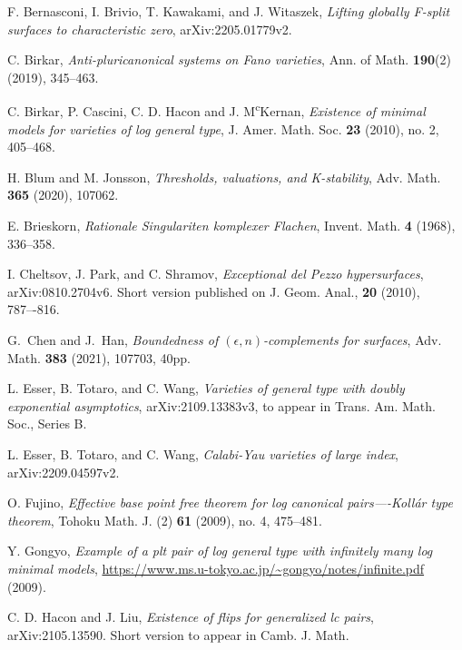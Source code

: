 \documentclass[11pt]{amsart}
\numberwithin{equation}{section}
\theoremstyle{definition}
\theoremstyle{definition}
\theoremstyle{definition}
\begin{document}
\begin{thebibliography}{ABCDE}
 F. Bernasconi, I. Brivio, T. Kawakami, and J. Witaszek, \textit{Lifting globally F-split surfaces to characteristic zero}, arXiv:2205.01779v2.

 C. Birkar, \textit{Anti-pluricanonical systems on Fano varieties}, Ann. of Math. \textbf{190}(2) (2019), 345--463.



	
C. Birkar, P. Cascini, C. D. Hacon and J. M\textsuperscript{c}Kernan, \textit{Existence of minimal models for varieties of log general type}, J. Amer. Math. Soc. \textbf{23} (2010), no. 2, 405--468.

 H. Blum and M. Jonsson, \textit{Thresholds, valuations, and K-stability}, Adv. Math. \textbf{365} (2020), 107062.

 E. Brieskorn, \textit{Rationale Singulariten komplexer Flachen}, Invent. Math. \textbf{4} (1968), 336--358.

 I. Cheltsov, J. Park, and C. Shramov, \textit{Exceptional del Pezzo hypersurfaces}, arXiv:0810.2704v6. Short version published on J. Geom. Anal., \textbf{20} (2010), 787–-816.

 G.~Chen and J.~Han, \textit{Boundedness of $(\epsilon, n)$-complements for surfaces}, Adv. Math. \textbf{383} (2021), 107703, 40pp.

 L. Esser, B. Totaro, and C. Wang, \textit{Varieties of general type with doubly exponential asymptotics}, arXiv:2109.13383v3, to appear in Trans. Am. Math. Soc., Series B.

 L. Esser, B. Totaro, and C. Wang, \textit{Calabi-Yau varieties of large index}, arXiv:2209.04597v2.

 O. Fujino, \textit{Effective base point free theorem for log canonical pairs—-Koll\'ar type theorem}, Tohoku Math. J. (2) \textbf{61} (2009), no. 4, 475--481.

 Y. Gongyo, \textit{Example of a plt pair of log general type with infinitely many log minimal models}, \url{https://www.ms.u-tokyo.ac.jp/~gongyo/notes/infinite.pdf} (2009).

 C. D. Hacon and J. Liu, \textit{Existence of flips for generalized lc pairs}, arXiv:2105.13590. Short version to appear in  Camb. J. Math.


\end{thebibliography}
\end{document}
